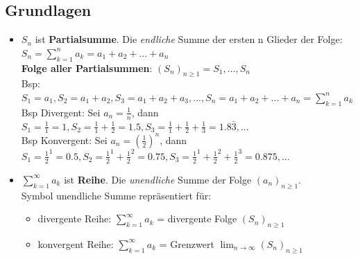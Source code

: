 \documentclass[a4paper]{article}
\def\limn{\lim_{n\to \infty}}
\begin{document}
\subsection{Grundlagen}
\begin{itemize}[leftmargin=4.5mm, topsep=1pt, itemsep=1pt]
  \item $S_n$ ist \textbf{Partialsumme}. Die \textit{endliche} Summe der ersten n Glieder der Folge: $S_n = \sum_{k=1}^{n} a_k = a_1 + a_2 + ... + a_n$\\
        \textbf{Folge aller Partialsummen}: $(S_n)_{n \geqslant 1} = S_1, ..., S_n$\\
        \tiny \color{gray}
        Bsp: $S_1 = a_1, S_2 = a_1 + a_2, S_3 = a_1 + a_2 + a_3, ..., S_n = a_1 + a_2 + ... + a_n = \sum_{k=1}^{n} a_k$ \\
        Bsp Divergent: Sei $a_n = \frac{1}{n}$, dann $S_1 = \frac{1}{1} = 1, S_2 = \frac{1}{1} + \frac{1}{2} = 1.5, S_3 = \frac{1}{1} + \frac{1}{2} + \frac{1}{3} = 1.8\bar{3}, ...$ \\
        Bsp Konvergent: Sei $a_n = (\frac{1}{2})^n$, dann $S_1 = \frac{1}{2}^1 = 0.5, S_2 = \frac{1}{2}^1 + \frac{1}{2}^2 = 0.75, S_3 = \frac{1}{2}^1 + \frac{1}{2}^2 + \frac{1}{2}^3 = 0.875, ...$
        \normalsize \color{black}
  \item $\sum_{k=1}^{\infty} a_k$ ist \textbf{Reihe}. Die \textit{unendliche} Summe der Folge $(a_n)_{n \geqslant 1}$. \\
      Symbol unendliche Summe repräsentiert für:
      \begin{itemize}[leftmargin=4.5mm, topsep=1pt, itemsep=1pt]
        \item divergente Reihe: $\sum_{k=1}^{\infty} a_k$ = divergente Folge $(S_n)_{n \geqslant 1}$ \\
        \item konvergent Reihe: $\sum_{k=1}^{\infty} a_k$ = Grenzwert $\limn (S_n)_{n \geqslant 1}$ \\
      \end{itemize}
\end{itemize}
\end{document}
